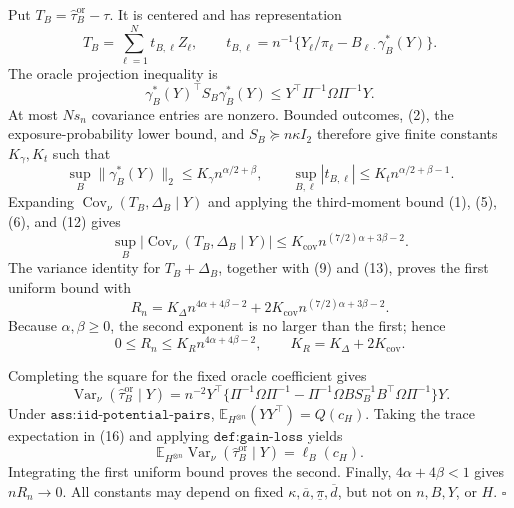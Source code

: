 Put \(T_B=\widehat\tau_B^{\mathrm{or}}-\tau\).  It is centered and has representation
\[
T_B=\sum_{\ell=1}^Nt_{B,\ell}Z_\ell,
\qquad
t_{B,\ell}=n^{-1}\{Y_\ell/\pi_\ell-B_{\ell\cdot}\gamma_B^*(Y)\}.
\tag{10}
\]
The oracle projection inequality is
\[
\gamma_B^*(Y)^{\top}S_B\gamma_B^*(Y)
\le Y^{\top}\Pi^{-1}\Omega\Pi^{-1}Y.
\tag{11}
\]
At most \(Ns_n\) covariance entries are nonzero.  Bounded outcomes, (2), the exposure-probability lower bound, and \(S_B\succeq n\kappa I_2\) therefore give finite constants \(K_\gamma,K_t\) such that
\[
\sup_B\lVert\gamma_B^*(Y)\rVert_2\le K_\gamma n^{\alpha/2+\beta},
\qquad
\sup_{B,\ell}|t_{B,\ell}|\le K_tn^{\alpha/2+\beta-1}.
\tag{12}
\]
Expanding \(\operatorname{Cov}_\nu(T_B,\Delta_B\mid Y)\) and applying the third-moment bound (1), (5), (6), and (12) gives
\[
\sup_B|\operatorname{Cov}_\nu(T_B,\Delta_B\mid Y)|
\le K_{\mathrm{cov}}n^{(7/2)\alpha+3\beta-2}.
\tag{13}
\]
The variance identity for \(T_B+\Delta_B\), together with (9) and (13), proves the first uniform bound with
\[
R_n=K_\Delta n^{4\alpha+4\beta-2}
+2K_{\mathrm{cov}}n^{(7/2)\alpha+3\beta-2}.
\tag{14}
\]
Because \(\alpha,\beta\ge0\), the second exponent is no larger than the first; hence
\[
0\le R_n\le K_Rn^{4\alpha+4\beta-2},
\qquad K_R=K_\Delta+2K_{\mathrm{cov}}.
\tag{15}
\]

Completing the square for the fixed oracle coefficient gives
\[
\operatorname{Var}_\nu(\widehat\tau_B^{\mathrm{or}}\mid Y)
=n^{-2}Y^{\top}\{\Pi^{-1}\Omega\Pi^{-1}
-\Pi^{-1}\Omega BS_B^{-1}B^{\top}\Omega\Pi^{-1}\}Y.
\tag{16}
\]
Under \(\texttt{ass:iid-potential-pairs}\), \(\mathbb E_{H^{\otimes n}}(YY^{\top})=Q(c_H)\).  Taking the trace expectation in (16) and applying \(\texttt{def:gain-loss}\) yields
\[
\mathbb E_{H^{\otimes n}}\operatorname{Var}_\nu(\widehat\tau_B^{\mathrm{or}}\mid Y)
=\ell_B(c_H).
\tag{17}
\]
Integrating the first uniform bound proves the second.  Finally, \(4\alpha+4\beta<1\) gives \(nR_n\to0\).  All constants may depend on fixed \(\kappa,\overline a,\underline\pi,\overline d\), but not on \(n,B,Y\), or \(H\). \(\square\)